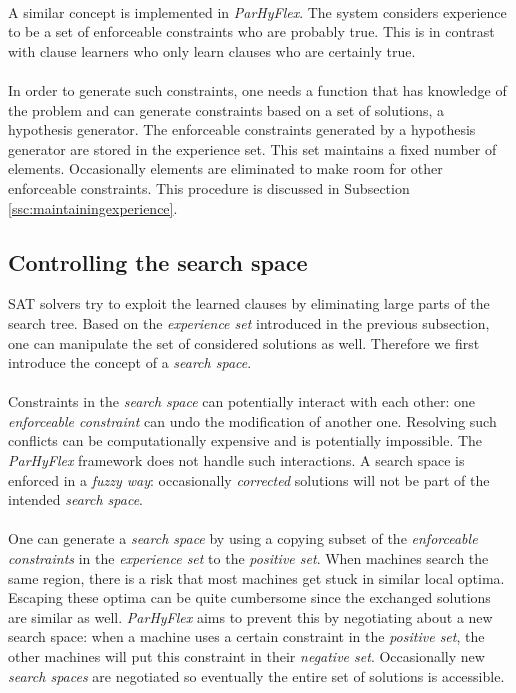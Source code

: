 \documentclass[a4paper,10pt]{article}
\newcommand{\seclab}[1]{\label{sec:#1}}
\newcommand{\sscref}[1]{\ref{ssc:#1}}
\theoremstyle{definition}
\begin{document}
\paragraph{}
A similar concept is implemented in \emph{ParHyFlex}. The system considers experience to be a set of enforceable constraints who are probably true. This is in contrast with clause learners who only learn clauses who are certainly true.

\paragraph{}
In order to generate such constraints, one needs a function that has knowledge of the problem and can generate constraints based on a set of solutions, a hypothesis generator. The enforceable constraints generated by a hypothesis generator are stored in the experience set. This set maintains a fixed number of elements. Occasionally elements are eliminated to make room for other enforceable constraints. This procedure is discussed in Subsection \sscref{maintainingexperience}.

\subsection{Controlling the search space}
\seclab{controllingsearchspace}
SAT solvers try to exploit the learned clauses by eliminating large parts of the search tree. Based on the \emph{experience set} introduced in the previous subsection, one can manipulate the set of considered solutions as well. Therefore we first introduce the concept of a \emph{search space}.
\paragraph{}
Constraints in the \emph{search space} can potentially interact with each other: one \emph{enforceable constraint} can undo the modification of another one. Resolving such conflicts can be computationally expensive and is potentially impossible. The \emph{ParHyFlex} framework does not handle such interactions. A search space is enforced in a \emph{fuzzy way}: occasionally \emph{corrected} solutions will not be part of the intended \emph{search space}.

\paragraph{}
One can generate a \emph{search space} by using a copying subset of the \emph{enforceable constraints} in the \emph{experience set} to the \emph{positive set}. When machines search the same region, there is a risk that most machines get stuck in similar local optima. Escaping these optima can be quite cumbersome since the exchanged solutions are similar as well. \emph{ParHyFlex} aims to prevent this by negotiating about a new search space: when a machine uses a certain constraint in the \emph{positive set}, the other machines will put this constraint in their \emph{negative set}. Occasionally new \emph{search spaces} are negotiated so eventually the entire set of solutions is accessible.
\end{document}
